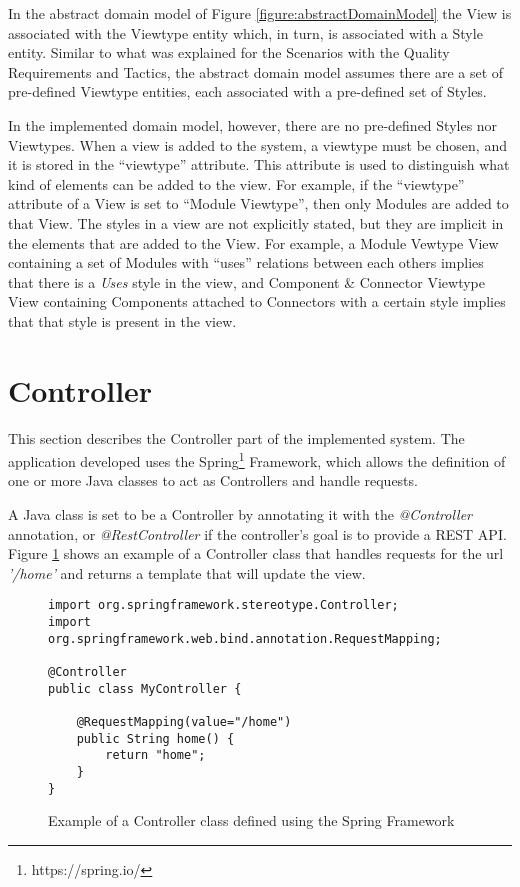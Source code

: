 In the abstract domain model of Figure \ref{figure:abstractDomainModel} the View is associated with the Viewtype entity which, in turn, is associated with a Style entity. Similar to what was explained for the Scenarios with the Quality Requirements and Tactics, the abstract domain model assumes there are a set of pre-defined Viewtype entities, each associated with a pre-defined set of Styles. 

In the implemented domain model, however, there are no pre-defined Styles nor Viewtypes. When a view is added to the system, a viewtype must be chosen, and it is stored in the ``viewtype'' attribute. This attribute is used to distinguish what kind of elements can be added to the view. For example, if the ``viewtype'' attribute of a View is set to ``Module Viewtype'', then only Modules are added to that View. The styles in a view are not explicitly stated, but they are implicit in the elements that are added to the View. For example, a Module Vewtype View containing a set of Modules with ``uses'' relations between each others implies that there is a \textit{Uses} style in the view, and Component \& Connector Viewtype View containing Components attached to Connectors with a certain style implies that that style is present in the view. 

\section{Controller}

This section describes the Controller part of the implemented system. The application developed uses the Spring\footnote{https://spring.io/} Framework, which allows the definition of one or more Java classes to act as Controllers and handle requests.

A Java class is set to be a Controller by annotating it with the \textit{@Controller} annotation, or \textit{@RestController} if the controller's goal is to provide a REST API. Figure \ref{figure:springController} shows an example of a Controller class that handles requests for the url \textit{'/home'} and returns a template that will update the view.

\begin{figure}[h]
\lstset{style=customjava}
\begin{lstlisting}
import org.springframework.stereotype.Controller;
import org.springframework.web.bind.annotation.RequestMapping;

@Controller
public class MyController {

	@RequestMapping(value="/home")
	public String home() {
		return "home";
	}
}
\end{lstlisting}
\caption{Example of a Controller class defined using the Spring Framework} 
\label{figure:springController}
\end{figure}

